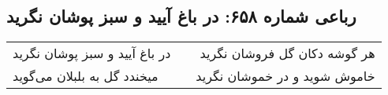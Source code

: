 \begin{center}
\section*{رباعی شماره ۶۵۸: در باغ آیید و سبز پوشان نگرید}
\label{sec:0658}
\begin{longtable}{l p{0.5cm} r}
در باغ آیید و سبز پوشان نگرید
&&
هر گوشه دکان گل فروشان نگرید
\\
میخندد گل به بلبلان می‌گوید
&&
خاموش شوید و در خموشان نگرید
\\
\end{longtable}
\end{center}
